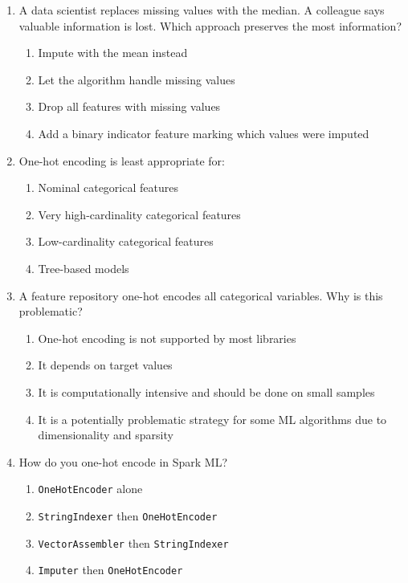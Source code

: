\documentclass[11pt]{article}
\begin{document}
\begin{enumerate}[leftmargin=*, label=\textbf{Q\arabic*.}, start=39]
		\item A data scientist replaces missing values with the median. A colleague says valuable information is lost. Which approach preserves the most information?
		\begin{enumerate}[label=(\alph*)]
			\item Impute with the mean instead
			\item Let the algorithm handle missing values
			\item Drop all features with missing values
			\item Add a binary indicator feature marking which values were imputed
		\end{enumerate}
		
		\item One-hot encoding is least appropriate for:
		\begin{enumerate}[label=(\alph*)]
			\item Nominal categorical features
			\item Very high-cardinality categorical features
			\item Low-cardinality categorical features
			\item Tree-based models
		\end{enumerate}
		
		\item A feature repository one-hot encodes all categorical variables. Why is this problematic?
		\begin{enumerate}[label=(\alph*)]
			\item One-hot encoding is not supported by most libraries
			\item It depends on target values
			\item It is computationally intensive and should be done on small samples
			\item It is a potentially problematic strategy for some ML algorithms due to dimensionality and sparsity
		\end{enumerate}
		
		\item How do you one-hot encode in Spark ML?
		\begin{enumerate}[label=(\alph*)]
			\item \texttt{OneHotEncoder} alone
			\item \texttt{StringIndexer} then \texttt{OneHotEncoder}
			\item \texttt{VectorAssembler} then \texttt{StringIndexer}
			\item \texttt{Imputer} then \texttt{OneHotEncoder}
		\end{enumerate}
		

\end{enumerate}
\end{document}

